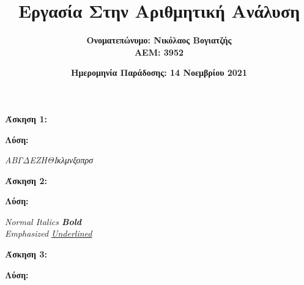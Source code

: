 \documentclass{article}
\title{\textbf{Εργασία Στην Αριθμητική Ανάλυση}}
\author{\textbf{Ονοματεπώνυμο: Νικόλαος Βογιατζής} \\ \textbf{ΑΕΜ: 3952}}
\date{\textbf{Ημερομηνία Παράδοσης: 14 Νοεμβρίου 2021}}
\begin{document}
\maketitle

\textbf{\large{Άσκηση 1:}}\\
\par
\textbf{\large{Λύση: }}
\begin{center}
\it{
\scriptsize Α\footnotesize B\small Γ\normalsize Δ\large Ε\Large Ζ\LARGE Η\huge Θ\Huge Ι\huge κ\LARGE λ\Large μ\large ν\normalsize ξ\small ο\footnotesize π\scriptsize ρ\tiny σ}
\end{center}

\textbf{\large{Άσκηση 2:}}\\
\par
\textbf{\large{Λύση: }}
\begin{center}
\emph{\Huge{Normal Italics \textbf {Bold}\\Emphasized \underline {Underlined}}}
\end{center}

\newpage
\textbf{\large{Άσκηση 3:}}\\
\par
\textbf{\large{Λύση: }}
\end{document}
